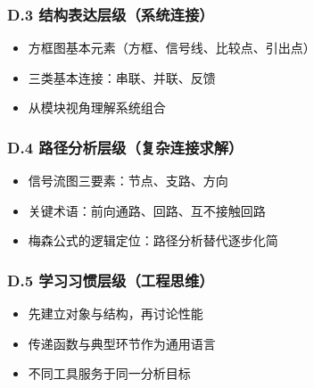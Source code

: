 \documentclass[
  11pt]{article}
\providecommand{\tightlist}{%
  \setlength{\itemsep}{0pt}\setlength{\parskip}{0pt}}
\begin{document}
\subsubsection{D.3
结构表达层级（系统连接）}\label{d.3-ux7ed3ux6784ux8868ux8fbeux5c42ux7ea7ux7cfbux7edfux8fdeux63a5}

\begin{itemize}
\tightlist
\item
  方框图基本元素（方框、信号线、比较点、引出点）
\item
  三类基本连接：串联、并联、反馈
\item
  从模块视角理解系统组合
\end{itemize}

\subsubsection{D.4
路径分析层级（复杂连接求解）}\label{d.4-ux8defux5f84ux5206ux6790ux5c42ux7ea7ux590dux6742ux8fdeux63a5ux6c42ux89e3}

\begin{itemize}
\tightlist
\item
  信号流图三要素：节点、支路、方向
\item
  关键术语：前向通路、回路、互不接触回路
\item
  梅森公式的逻辑定位：路径分析替代逐步化简
\end{itemize}

\subsubsection{D.5
学习习惯层级（工程思维）}\label{d.5-ux5b66ux4e60ux4e60ux60efux5c42ux7ea7ux5de5ux7a0bux601dux7ef4}

\begin{itemize}
\tightlist
\item
  先建立对象与结构，再讨论性能
\item
  传递函数与典型环节作为通用语言
\item
  不同工具服务于同一分析目标
\end{itemize}
\end{document}
